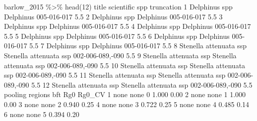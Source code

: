 \documentclass[
]{book}
\newenvironment{Shaded}{\begin{snugshade}}{\end{snugshade}}
\newcommand{\DecValTok}[1]{\textcolor[rgb]{0.00,0.00,0.81}{#1}}
\newcommand{\FloatTok}[1]{\textcolor[rgb]{0.00,0.00,0.81}{#1}}
\newcommand{\FunctionTok}[1]{\textcolor[rgb]{0.00,0.00,0.00}{#1}}
\newcommand{\NormalTok}[1]{#1}
\newcommand{\SpecialCharTok}[1]{\textcolor[rgb]{0.00,0.00,0.00}{#1}}
\begin{document}
\begin{Shaded}
\begin{Highlighting}[]
\NormalTok{barlow\_2015 }\SpecialCharTok{\%\textgreater{}\%} \FunctionTok{head}\NormalTok{(}\DecValTok{12}\NormalTok{)}
\NormalTok{                    title             scientific              spp truncation}
\DecValTok{1}\NormalTok{           Delphinus spp              Delphinus      }\DecValTok{005{-}016{-}017}        \FloatTok{5.5}
\DecValTok{2}\NormalTok{           Delphinus spp              Delphinus      }\DecValTok{005{-}016{-}017}        \FloatTok{5.5}
\DecValTok{3}\NormalTok{           Delphinus spp              Delphinus      }\DecValTok{005{-}016{-}017}        \FloatTok{5.5}
\DecValTok{4}\NormalTok{           Delphinus spp              Delphinus      }\DecValTok{005{-}016{-}017}        \FloatTok{5.5}
\DecValTok{5}\NormalTok{           Delphinus spp              Delphinus      }\DecValTok{005{-}016{-}017}        \FloatTok{5.5}
\DecValTok{6}\NormalTok{           Delphinus spp              Delphinus      }\DecValTok{005{-}016{-}017}        \FloatTok{5.5}
\DecValTok{7}\NormalTok{           Delphinus spp              Delphinus      }\DecValTok{005{-}016{-}017}        \FloatTok{5.5}
\DecValTok{8}\NormalTok{  Stenella attenuata ssp Stenella attenuata ssp }\DecValTok{002{-}006{-}089}\NormalTok{,}\SpecialCharTok{{-}}\DecValTok{090}        \FloatTok{5.5}
\DecValTok{9}\NormalTok{  Stenella attenuata ssp Stenella attenuata ssp }\DecValTok{002{-}006{-}089}\NormalTok{,}\SpecialCharTok{{-}}\DecValTok{090}        \FloatTok{5.5}
\DecValTok{10}\NormalTok{ Stenella attenuata ssp Stenella attenuata ssp }\DecValTok{002{-}006{-}089}\NormalTok{,}\SpecialCharTok{{-}}\DecValTok{090}        \FloatTok{5.5}
\DecValTok{11}\NormalTok{ Stenella attenuata ssp Stenella attenuata ssp }\DecValTok{002{-}006{-}089}\NormalTok{,}\SpecialCharTok{{-}}\DecValTok{090}        \FloatTok{5.5}
\DecValTok{12}\NormalTok{ Stenella attenuata ssp Stenella attenuata ssp }\DecValTok{002{-}006{-}089}\NormalTok{,}\SpecialCharTok{{-}}\DecValTok{090}        \FloatTok{5.5}
\NormalTok{   pooling regions bft   Rg0 Rg0\_CV}
\DecValTok{1}\NormalTok{     none    none   }\DecValTok{0} \FloatTok{1.000}   \FloatTok{0.00}
\DecValTok{2}\NormalTok{     none    none   }\DecValTok{1} \FloatTok{1.000}   \FloatTok{0.00}
\DecValTok{3}\NormalTok{     none    none   }\DecValTok{2} \FloatTok{0.940}   \FloatTok{0.25}
\DecValTok{4}\NormalTok{     none    none   }\DecValTok{3} \FloatTok{0.722}   \FloatTok{0.25}
\DecValTok{5}\NormalTok{     none    none   }\DecValTok{4} \FloatTok{0.485}   \FloatTok{0.14}
\DecValTok{6}\NormalTok{     none    none   }\DecValTok{5} \FloatTok{0.394}   \FloatTok{0.20}

\end{Highlighting}
\end{Shaded}
\end{document}
